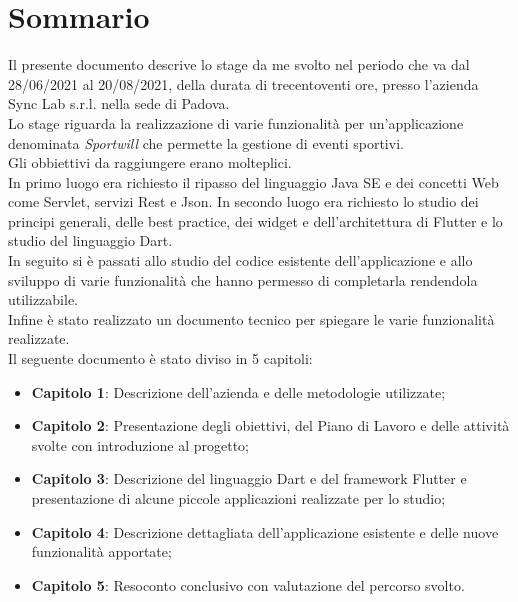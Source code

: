 
\cleardoublepage
{}
{}
\begingroup
\let\clearpage\relax
\let\cleardoublepage\relax
\let\cleardoublepage\relax

\chapter*{Sommario}

Il presente documento descrive lo stage da me svolto nel periodo che va dal 28/06/2021 al 20/08/2021, della durata di trecentoventi ore, presso l'azienda Sync Lab s.r.l. nella sede di Padova.\\
Lo stage riguarda la realizzazione di varie funzionalità per un'applicazione denominata \textit{Sportwill} che permette la gestione di eventi sportivi.\\
Gli obbiettivi da raggiungere erano molteplici.\\
In primo luogo era richiesto il ripasso del linguaggio Java SE e dei concetti Web come Servlet, servizi Rest e Json.
In secondo luogo era richiesto lo studio dei principi generali, delle best practice, dei widget e dell'architettura di Flutter e lo studio del linguaggio Dart.\\
In seguito si è passati allo studio del codice esistente dell'applicazione e allo sviluppo di varie funzionalità che hanno permesso di completarla rendendola utilizzabile.\\
Infine è stato realizzato un documento tecnico per spiegare le varie funzionalità realizzate.\\
Il seguente documento è stato diviso in 5 capitoli:
\begin{itemize}
	\item \textbf{Capitolo 1}: Descrizione dell'azienda e delle metodologie utilizzate; \\
	\item \textbf{Capitolo 2}: Presentazione degli obiettivi, del Piano di Lavoro e delle attività svolte con introduzione al progetto; \\
	\item \textbf{Capitolo 3}: Descrizione del linguaggio Dart e del framework Flutter e presentazione di alcune piccole applicazioni realizzate per lo studio; \\
	\item \textbf{Capitolo 4}: Descrizione dettagliata dell'applicazione esistente e delle nuove funzionalità apportate; \\
	\item \textbf{Capitolo 5}: Resoconto conclusivo con valutazione del percorso svolto. \\
\end{itemize}

%
%

\endgroup			

\vfill

